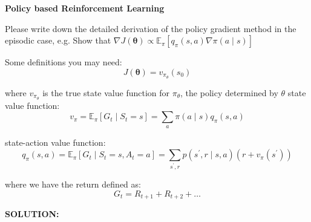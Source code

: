 \documentclass{homework}
\begin{document}
\begin{shaded}
\question \textbf{Policy based Reinforcement Learning}

Please write down the detailed derivation of the policy gradient method in the episodic case, e.g. Show that $\nabla J(\boldsymbol{\theta}) \propto \mathbb{E}_{\pi}\left[q_{\pi}(s, a) \nabla \pi(a \mid s)\right]$

Some definitions you may need:
$$
J(\boldsymbol{\theta})=v_{\pi_{\theta}}\left(s_{0}\right)
$$

where $v_{\pi_{\theta}}$ is the true state value function for $\pi_{\theta}$, the policy determined by $\theta$ state value function:
$$
v_{\pi}=\mathbb{E}_{\pi}\left[G_{t} \mid S_{t}=s\right]=\sum_{a} \pi(a \mid s) q_{\pi}(s, a)
$$

state-action value function:
$$
q_{\pi}(s, a)=\mathbb{E}_{\pi}\left[G_{t} \mid S_{t}=s, A_{t}=a\right]=\sum_{s^{\prime}, r} p\left(s^{\prime}, r \mid s, a\right)\left(r+v_{\pi}\left(s^{\prime}\right)\right)
$$

where we have the return defined as:
$$
G_{t}=R_{t+1}+R_{t+2}+\ldots
$$

\end{shaded}

\textbf{SOLUTION:}



\end{document}
